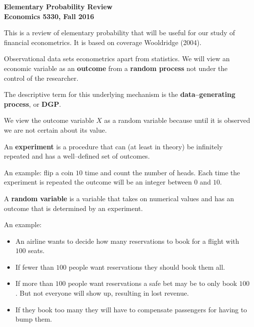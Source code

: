 \documentclass[11pt]{article}
\begin{document}
\pagestyle{empty}

\textbf{Elementary Probability Review} \\
\textbf{Economics 5330, Fall 2016} \\
\vspace{3.5mm}


This is a review of elementary probability that will be useful for our study of financial econometrics. It is based on coverage Wooldridge (2004).

\vspace{3.5mm}

Observational data sets econometrics apart from statistics.  We will view an economic variable as an \textbf{outcome}
from a \textbf{random process} not under the control of the researcher.

\vspace{2mm}

The descriptive term for this underlying mechanism is the \textbf{data--generating process}, or \textbf{DGP}.

\vspace{2mm}

We view the outcome variable $X$ as a random variable because until it is observed we are not certain about its value.

\vspace{2mm}

An \textbf{experiment} is a procedure that can (at least in theory) be infinitely repeated and has a well--defined set 
of outcomes.

\vspace{2mm}
An example: flip a coin $10$ time and count the number of heads. Each time the experiment is repeated the outcome will 
be an integer between $0$ and $10$.

\vspace{2mm}

A \textbf{random variable} is a variable that takes on numerical values and has an outcome that is determined by an experiment.
\vspace{2mm}

An example: 

\begin{itemize}
 \item An airline wants to decide how many reservations to book for a flight with $100$ seats.
 \item If fewer than $100$ people want reservations they should book them all.
 \item If more than $100$ people want reservations a safe bet may be to only book $100$. But not everyone will show up, resulting
       in lost revenue.
 \item If they book too many they will have to compensate passengers for having to bump them.
\end{itemize}
\end{document}
